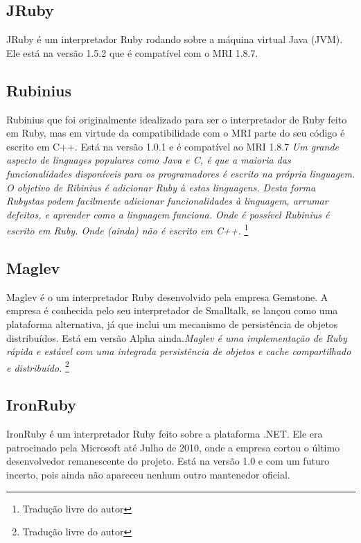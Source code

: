 \subsection{JRuby}
JRuby é um interpretador Ruby rodando sobre a máquina virtual Java (JVM). Ele está na versão 1.5.2 que é compatível com o MRI 1.8.7.

\subsection{Rubinius}
Rubinius que foi originalmente idealizado para ser o interpretador de Ruby feito em Ruby, mas em virtude da compatibilidade com o MRI parte do seu código é escrito em C++. Está na versão 1.0.1 e é compatível ao MRI 1.8.7 \emph{Um grande aspecto de linguages populares como Java e C, é que a maioria das funcionalidades disponíveis para os programadores é escrito na própria linguagem. O objetivo de Ribinius é adicionar Ruby à estas linguagens. Desta forma Rubystas podem facilmente adicionar funcionalidades à linguagem, arrumar defeitos, e aprender como a linguagem funciona. Onde é possível Rubinius é escrito em Ruby. Onde (ainda) não é escrito em C++.}
\cite{rubinius_official_site}\footnote{Tradução livre do autor}

\subsection{Maglev}
Maglev é o um interpretador Ruby desenvolvido pela empresa Gemstone. A empresa é conhecida pelo seu interpretador de Smalltalk, se lançou como uma plataforma alternativa, já que inclui um mecanismo de persistência de objetos distribuídos. Está em versão Alpha ainda.\emph{Maglev é uma implementação de Ruby rápida e estável com uma integrada persistência de objetos e cache compartilhado e distribuído.}
\cite{maglev_official_site}\footnote{Tradução livre do autor}

\subsection{IronRuby}
IronRuby é um interpretador Ruby feito sobre a plataforma .NET. Ele era patrocinado pela Microsoft até Julho de 2010, onde a empresa cortou o último desenvolvedor remanescente do projeto. Está na versão 1.0 e com um futuro incerto, pois ainda não apareceu nenhum outro mantenedor oficial.

